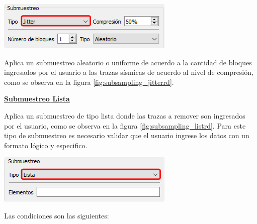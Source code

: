 \documentclass[12pt,twoside,letter]{ol-softwaremanual}
\newenvironment{Figure}
  {\par\medskip\noindent\minipage{\linewidth}}
  {\endminipage\par\medskip}
\begin{document}
\begin{multicols}{2}
	
	\begin{Figure}
		\centering
		\includegraphics[width=0.8\linewidth]{subsampling-jitter.png}
		\label{fig:subsampling_jitterrd}
	\end{Figure}
	
	Aplica un submuestreo aleatorio o uniforme de acuerdo a la cantidad de bloques ingresados por el usuario a las trazas sísmicas de acuerdo al nivel de compresión, como se observa en la figura \ref{fig:subsampling_jitterrd}.
	
\end{multicols}

\underline{\textbf{Submuestreo Lista}}

\begin{multicols}{2}
	
	Aplica un submuestreo de tipo lista donde las trazas a remover son ingresados por el usuario, como se observa en la figura \ref{fig:subsampling_listrd}. Para este tipo de submuestreo es necesario validar que el usuario ingrese los datos con un formato lógico y especifico.
	
	\begin{Figure}
		\vspace{5mm}
		\centering
		\includegraphics[width=0.8\linewidth]{subsampling-list.png}
		\label{fig:subsampling_listrd}
	\end{Figure}
	
\end{multicols}

Las condiciones son las siguientes:
\end{document}
